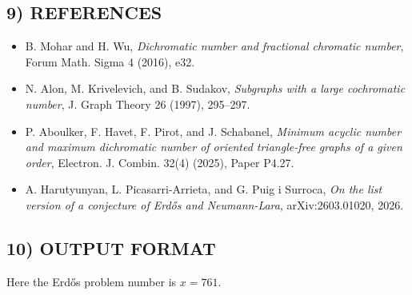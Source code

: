 \subsection*{9) REFERENCES}
\begin{itemize}
\item B. Mohar and H. Wu, \emph{Dichromatic number and fractional chromatic number}, Forum Math. Sigma 4 (2016), e32.
\item N. Alon, M. Krivelevich, and B. Sudakov, \emph{Subgraphs with a large cochromatic number}, J. Graph Theory 26 (1997), 295--297.
\item P. Aboulker, F. Havet, F. Pirot, and J. Schabanel, \emph{Minimum acyclic number and maximum dichromatic number of oriented triangle-free graphs of a given order}, Electron. J. Combin. 32(4) (2025), Paper P4.27.
\item A. Harutyunyan, L. Picasarri-Arrieta, and G. Puig i Surroca, \emph{On the list version of a conjecture of Erd\H{o}s and Neumann-Lara}, arXiv:2603.01020, 2026.
\end{itemize}

\subsection*{10) OUTPUT FORMAT}
Here the Erd\H{o}s problem number is $x=761$.

\bigskip
